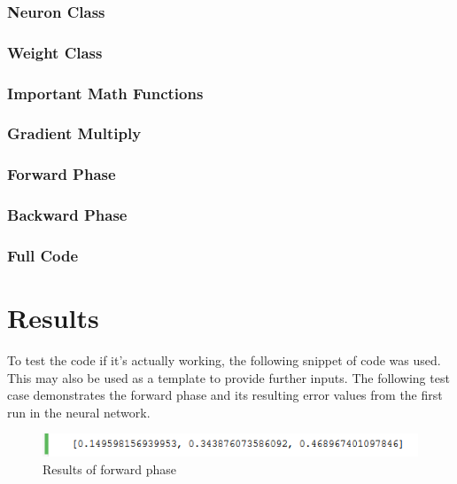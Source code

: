\documentclass[a4paper, 11pt, english]{article}
\begin{document}
\subsubsection{Neuron Class}

\subsubsection{Weight Class}

\subsubsection{Important Math Functions}

\subsubsection{Gradient Multiply} %

\subsubsection{Forward Phase}

\subsubsection{Backward Phase}

\subsubsection{Full Code}


\section{Results}
\par To test the code if it's actually working, the following snippet of code was used. This may also be used as a template to provide further inputs. The following test case demonstrates the forward phase and its resulting error values from the first run in the neural network.

\begin{figure}[H]
  \centering
  \includegraphics[width=12cm]{images/result1.png}
  \caption{Results of forward phase} %
  \label{fig:result1}
\end{figure}
\end{document}
